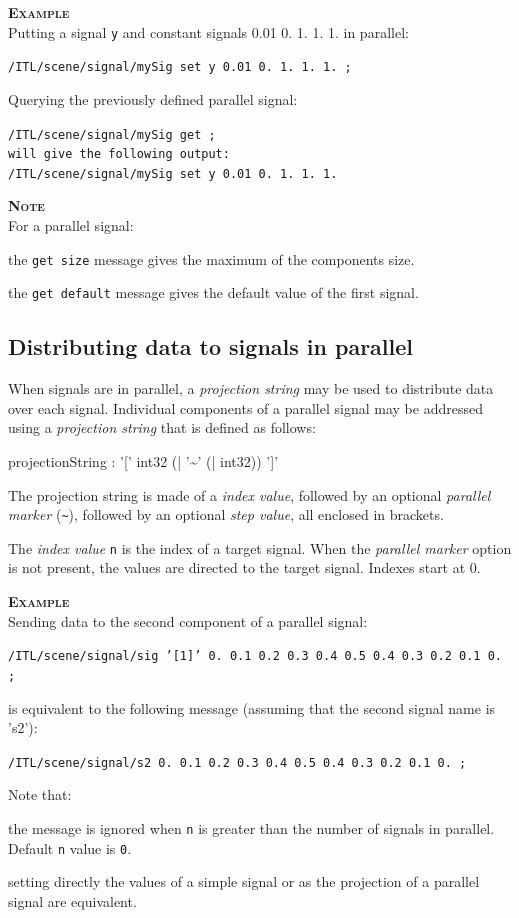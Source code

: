 \documentclass[a4paper,twoside]{report}
\newcommand{\subsublevel}[1]	{\subsection{#1}}
\newcommand{\OSC}[1]		{\texttt{#1}}
\newcommand{\values}[1]		{\texttt{#1}}
\newcommand{\example}		{\textbf{\hspace{-1.5cm}\textbf{\textsc{Example }}}}
\newcommand{\note}	[1]		{\vspace{2mm}\textbf{\hspace{-1.03cm}\textbf{\textsc{Note #1}}}}
\let\olditemize\itemize
\let\oldenditemize\enditemize
\renewenvironment{itemize} 	{\olditemize \setlength{\itemsep}{1mm}}{\oldenditemize}
\newcommand{\sample}	[1]			{\vspace{-2mm}\begin{center}\colorbox{mygrey}{
								\begin{minipage}[t]{0.9\columnwidth} 
								{\small \texttt{#1}}
								\end{minipage}}\end{center}}
\newcommand{\sampleindent}	{ \hspace{0.5cm} }
\begin{document}
\example \\
Putting a signal \OSC{y} and constant signals 0.01 0. 1. 1. 1. in parallel:
\sample{/ITL/scene/signal/mySig set y 0.01 0. 1. 1. 1. ;}
Querying the previously defined parallel signal:
\sample{/ITL/scene/signal/mySig get ;\\
will give the following output: \\
/ITL/scene/signal/mySig set y 0.01 0. 1. 1. 1.
}

\note{} \\
For a parallel signal:
\begin{itemize}
\item the \OSC{get size} message gives the maximum of the components size. 
\item the \OSC{get default} message gives the default value of the first signal. 
\end{itemize}

\subsublevel{Distributing data to signals in parallel}
\label{sigproj}

When signals are in parallel, a \emph{projection string} may be used to distribute data over each signal.
Individual components of a parallel signal may be addressed using a \emph{projection string} that is defined as follows:
\begin{rail}
projectionString :  '[' int32 (| '\~{}' (| int32)) ']'
\end{rail}

The projection string is made of a \emph{index value}, followed by an optional \emph{parallel marker} (\OSC{\~{}}), followed by an optional \emph{step value}, all enclosed in brackets.

The \emph{index value} \values{n} is the index of a target signal. When the \emph{parallel marker} option is not present, the values are directed to the target signal. Indexes start at 0.

\example \\
Sending data to the second component of a parallel signal:
\sample{/ITL/scene/signal/sig '[1]' 0.\ 0.1\ 0.2\ 0.3\ 0.4\ 0.5\ 0.4\ 0.3\ 0.2\ 0.1\ 0. ;}
\sampleindent is equivalent to the following message (assuming that the second signal name is 's2'):
\sample{/ITL/scene/signal/s2 0.\ 0.1\ 0.2\ 0.3\ 0.4\ 0.5\ 0.4\ 0.3\ 0.2\ 0.1\ 0. ;}

Note that:
\begin{itemize}
\item the message is ignored when \values{n} is greater than the number of signals in parallel. Default \values{n} value is \values{0}. 
\item setting directly the values of a simple signal or as the projection of a parallel signal are equivalent.
\end{itemize}
\end{document}
